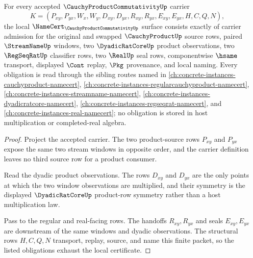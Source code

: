 \begin{theorem}
\label{thm:cauchy-product-commutativity-namecert-obligations}
For every accepted $\CauchyProductCommutativityUp$ carrier
$$
K=(P_{xy},P_{yx},W_x,W_y,D_{xy},D_{yx},R_{xy},R_{yx},E_{xy},E_{yx},H,C,Q,N),
$$
the local $\NameCert_{\CauchyProductCommutativityUp}$ surface consists exactly of carrier admission for the original and swapped $\CauchyProductUp$ source rows, paired $\StreamNameUp$ windows, two $\DyadicRatCoreUp$ product observations, two $\RegSeqRatUp$ classifier rows, two $\RealUp$ seal rows, componentwise $\hsame$ transport, displayed $\Cont$ replay, $\Pkg$ provenance, and local naming. Every obligation is read through the sibling routes named in \autoref{ch:concrete-instances-cauchyproduct-namecert}, \autoref{ch:concrete-instances-regularcauchyproduct-namecert}, \autoref{ch:concrete-instances-streamname-namecert}, \autoref{ch:concrete-instances-dyadicratcore-namecert}, \autoref{ch:concrete-instances-regseqrat-namecert}, and \autoref{ch:concrete-instances-real-namecert}; no obligation is stored in host multiplication or completed-real algebra.
\end{theorem}
\begin{proof}
Project the accepted carrier. The two product-source rows $P_{xy}$ and $P_{yx}$ expose the same two stream windows in opposite order, and the carrier definition leaves no third source row for a product consumer.

Read the dyadic product observations. The rows $D_{xy}$ and $D_{yx}$ are the only points at which the two window observations are multiplied, and their symmetry is the displayed $\DyadicRatCoreUp$ product-row symmetry rather than a host multiplication law.

Pass to the regular and real-facing rows. The handoffs $R_{xy},R_{yx}$ and seals $E_{xy},E_{yx}$ are downstream of the same windows and dyadic observations. The structural rows $H,C,Q,N$ transport, replay, source, and name this finite packet, so the listed obligations exhaust the local certificate.
\end{proof}

